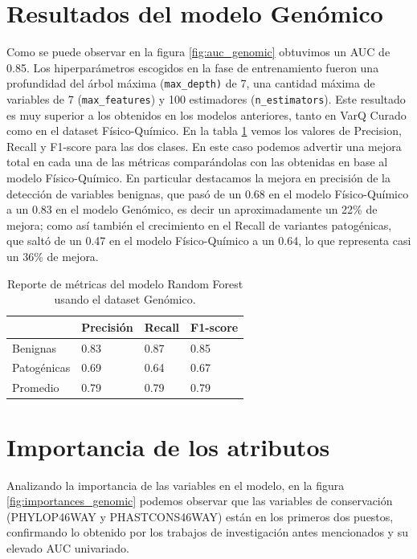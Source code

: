 \section{Resultados del modelo Genómico}

Como se puede observar en la figura \ref{fig:auc_genomic} obtuvimos un AUC de 0.85. Los hiperparámetros escogidos en la fase de entrenamiento fueron una profundidad del árbol máxima (\texttt{max\_depth)} de 7, una cantidad máxima de variables de 7 (\texttt{max\_features}) y 100 estimadores (\texttt{\texttt{n\_estimators}}).
Este resultado es muy superior a los obtenidos en los modelos anteriores, tanto en VarQ Curado como en el dataset Físico-Químico. En la tabla \ref{tab:metrics_genomic} vemos los valores de Precision, Recall y F1-score para las dos clases. En este caso podemos advertir una mejora total en cada una de las métricas comparándolas con las obtenidas en base al modelo Físico-Químico. En particular destacamos la mejora en precisión de la detección de variables benignas, que pasó de un 0.68 en el modelo Físico-Químico a un 0.83 en el modelo Genómico, es decir un aproximadamente un 22\% de mejora; como así también el crecimiento en el Recall de variantes patogénicas, que saltó de un 0.47 en el modelo Físico-Químico a un 0.64, lo que representa casi un 36\% de mejora.

\begin{table}[H]
\centering
\begin{tabular}{|l|l|l|l|}
\hline
             & Precisión & Recall & F1-score \\ \hline
Benignas     & 0.83      & 0.87   & 0.85     \\ \hline
Patogénicas  & 0.69      & 0.64   & 0.67     \\ \hline
Promedio     & 0.79      & 0.79   & 0.79     \\ \hline
\end{tabular}
\caption{Reporte de métricas del modelo Random Forest usando el dataset Genómico.}
\label{tab:metrics_genomic}
\end{table}



\section{Importancia de los atributos}
Analizando la importancia de las variables en el modelo, en la figura \ref{fig:importances_genomic} podemos observar que las variables de conservación (PHYLOP46WAY y PHASTCONS46WAY) están en los primeros dos puestos, confirmando lo obtenido por los trabajos de investigación antes mencionados \cite{Shihab2015} \cite{Carter2013} y su elevado AUC univariado. 

